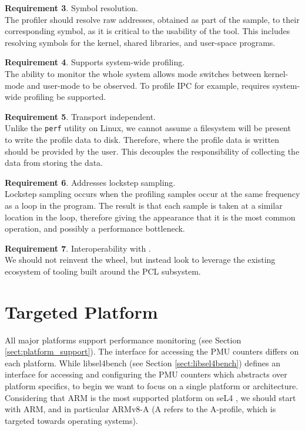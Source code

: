 \textbf{Requirement 3}. Symbol resolution.\\
The profiler should resolve raw addresses, obtained as part of the sample, to their corresponding symbol, as it is critical to the usability of the tool. This includes resolving symbols for the kernel, shared libraries, and user-space programs.

\textbf{Requirement 4}. Supports system-wide profiling.\\
The ability to monitor the whole system allows mode switches between kernel-mode and user-mode to be observed. To profile IPC for example, requires system-wide profiling be supported. 

\textbf{Requirement 5}. Transport independent.\\
Unlike the \texttt{perf} utility on Linux, we cannot assume a filesystem will be present to write the profile data to disk. Therefore, where the profile data is written should be provided by the user. This decouples the responsibility of collecting the data from storing the data.

\textbf{Requirement 6}. Addresses lockstep sampling.\\
Lockstep sampling occurs when the profiling samples occur at the same frequency as a loop in the program. The result is that each sample is taken at a similar location in the loop, therefore giving the appearance that it is the most common operation, and possibly a performance bottleneck.

\textbf{Requirement 7}. Interoperability with .\\
We should not reinvent the wheel, but instead look to leverage the existing ecosystem of tooling built around the PCL subsystem. 

\section{Targeted Platform}

All major platforms support performance monitoring (see Section \ref{sect:platform_support}). The interface for accessing the PMU counters differs on each platform. While libsel4bench (see Section \ref{sect:libsel4bench}) defines an interface for accessing and configuring the PMU counters \cite{github_libsel4bench_sel4bench_header} which abstracts over platform specifics, to begin we want to focus on a single platform or architecture. Considering that ARM is the most supported platform on seL4 \cite{DocsSeL4Hardware}, we should start with ARM, and in particular ARMv8-A (A refers to the A-profile, which is targeted towards operating systems).

